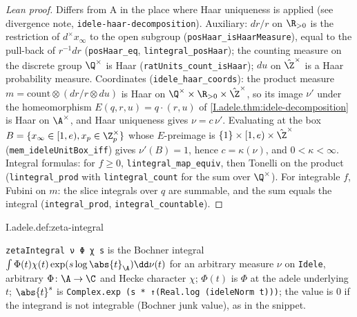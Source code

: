 \begin{proof}[Lean proof]
Differs from A in the place where Haar uniqueness is applied (see divergence note, \texttt{idele-haar-decomposition}). Auxiliary: $dr/r$ on $\R_{>0}$ is the restriction of $d^\times x_\infty$ to the open subgroup (\texttt{posHaar\_isHaarMeasure}), equal to the pull-back of $r^{-1}dr$ (\texttt{posHaar\_eq}, \texttt{lintegral\_posHaar}); the counting measure on the discrete group $\Q^\times$ is Haar (\texttt{ratUnits\_count\_isHaar}); $d u$ on $\hat\Z^\times$ is a Haar probability measure. Coordinates (\texttt{idele\_haar\_coords}): the product measure $m=\mathrm{count}\otimes(dr/r\otimes du)$ is Haar on $\Q^\times\times\R_{>0}\times\hat\Z^\times$, so its image $\nu'$ under the homeomorphism $E(q,r,u)=q\cdot(r,u)$ of \cref{I.adele.thm:idele-decomposition} is Haar on $\A^\times$, and Haar uniqueness gives $\nu=c\,\nu'$. Evaluating at the box $B=\{x_\infty\in[1,e),x_p\in\Z_p^\times\}$ whose $E$-preimage is $\{1\}\times[1,e)\times\hat\Z^\times$ (\texttt{mem\_ideleUnitBox\_iff}) gives $\nu'(B)=1$, hence $c=\kappa(\nu)$, and $0<\kappa<\infty$. Integral formulas: for $f\ge0$, \texttt{lintegral\_map\_equiv}, then Tonelli on the product (\texttt{lintegral\_prod} with \texttt{lintegral\_count} for the sum over $\Q^\times$). For integrable $f$, Fubini on $m$: the slice integrals over $q$ are summable, and the sum equals the integral (\texttt{integral\_prod}, \texttt{integral\_countable}).
\end{proof}

\begin{definition}
\end{definition}
\begin{tfformal}{I.adele.def:zeta-integral}
\begin{tffidelity}
\texttt{zetaIntegral ν Φ χ s} is the Bochner integral $\int\Phi(t)\chi(t)\exp(s\log\abs{t}_\A)\dd\nu(t)$ for an arbitrary measure $\nu$ on \texttt{Idele}, arbitrary $\Phi\colon\A\to\C$ and Hecke character $\chi$; $\Phi(t)$ is $\Phi$ at the adele underlying $t$; $\abs{t}^s$ is \texttt{Complex.exp (s * ↑(Real.log (ideleNorm t)))}; the value is $0$ if the integrand is not integrable (Bochner junk value), as in the snippet.
\end{tffidelity}
\end{tfformal}

